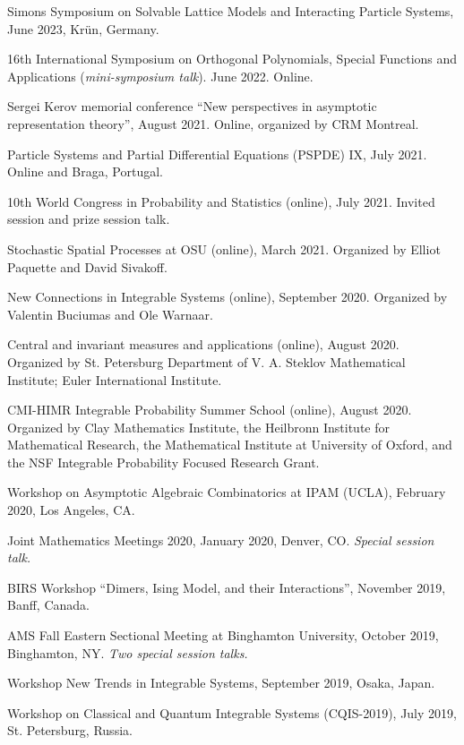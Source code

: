 \documentclass[letterpaper,11pt]{article}
\begin{document}
\begin{etaremune}
	\item
	Simons Symposium on Solvable Lattice Models and Interacting Particle Systems, June 2023, Kr\"un, Germany.
	\item
	16th International Symposium on Orthogonal Polynomials, Special Functions and Applications (\emph{mini-symposium talk}).
	June 2022. Online.
\item
	Sergei Kerov memorial conference
	``New perspectives in asymptotic representation theory'',
	August 2021. Online, organized by CRM Montreal.
\item
	Particle Systems and Partial Differential Equations (PSPDE) IX,
	July 2021. Online and Braga, Portugal.
\item
	10th World Congress in Probability and Statistics (online),
	July 2021.
	Invited session and prize session talk.
\item
	Stochastic Spatial Processes at OSU (online),
	March 2021.
	Organized by Elliot Paquette and David Sivakoff.
\item New Connections in Integrable Systems (online),
	September 2020.
	Organized by Valentin Buciumas and Ole Warnaar.
\item
	Central and invariant measures and applications (online),
	August 2020.
	Organized by St. Petersburg Department of V. A. Steklov Mathematical Institute; Euler International Institute.
\item
	CMI-HIMR Integrable Probability Summer School (online),
	August 2020.
	Organized by
	Clay Mathematics Institute, the Heilbronn Institute for Mathematical Research,
	the Mathematical Institute at University of Oxford,
	and the NSF Integrable Probability Focused Research Grant.
\item
	Workshop on Asymptotic Algebraic Combinatorics at
	IPAM (UCLA), February 2020,
	Los Angeles, CA.
\item Joint Mathematics Meetings 2020,
	January 2020,
	Denver, CO.
	\emph{Special session talk.}
	\item
		BIRS Workshop ``Dimers, Ising Model, and their Interactions'',
		November 2019, Banff, Canada.
	\item AMS Fall Eastern Sectional Meeting
	at
	Binghamton University,
	October 2019,
	Binghamton, NY.
	\emph{Two special session talks.}
	\item
		Workshop New Trends in Integrable Systems,
		September 2019, Osaka, Japan.
	\item
		Workshop on Classical and Quantum Integrable
		Systems (CQIS-2019), July 2019, St. Petersburg, Russia.
	\item

\end{etaremune}
\end{document}
